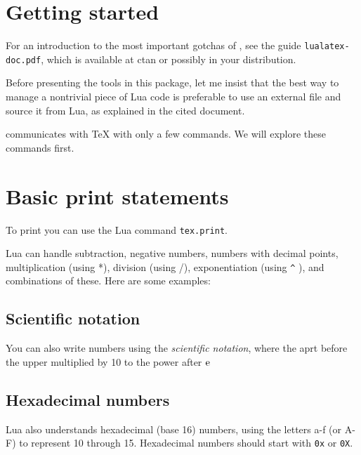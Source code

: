 \section{Getting started}

For an introduction to the most important gotchas of \cmd{\directlua}, see the guide \texttt{lualatex-doc.pdf}, which is available at ctan or possibly in your distribution.

Before presenting the tools in this package, let me insist that the best way to manage a nontrivial piece of Lua code is preferable to use an external file and source it from Lua, as explained in the cited document.

\LuaTeX communicates with TeX with only a few commands. We will explore these commands first.

\section{Basic print statements}

To print you can use the Lua command \lstinline{tex.print}.


Lua can handle subtraction, negative numbers, numbers with decimal points, multiplication (using *),
division (using /), exponentiation (using \texttt{\^} ), and combinations of these. Here are some examples:
\begin{tcblisting}{}
\end{tcblisting}

\subsection{Scientific notation}

You can also write numbers using the \textit{scientific notation}, where the aprt before the upper multiplied by 10 to the power after $\textup{e}$

\begin{tcblisting}{}
\end{tcblisting}

\subsection{Hexadecimal numbers}
Lua also understands hexadecimal (base 16) numbers, using the letters
a-f (or A-F) to represent 10 through 15. Hexadecimal numbers should start with \texttt{0x} or \texttt{0X}.
\begin{tcblisting}{}
\end{tcblisting}


